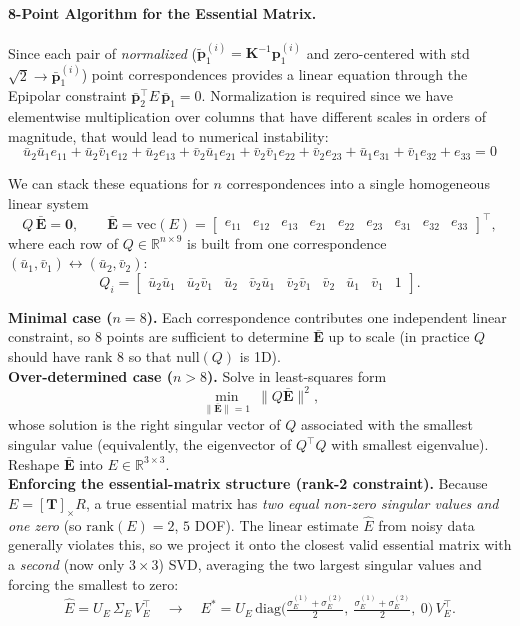 \documentclass{article}
\begin{document}
\paragraph{8-Point Algorithm for the Essential Matrix.} Since each pair of \textit{normalized} ($\mathbf{\tilde{p}}_1^{(i)}=\mathbf{K}^{-1}\mathbf{p}_1^{(i)}$ and zero-centered with std $\sqrt{2} \rightarrow  \mathbf{\bar{p}}_1^{(i)}$) point correspondences provides a linear equation through the Epipolar constraint $\bar{\mathbf p}_2^\top E\,\bar{\mathbf p}_1 = 0$. Normalization is required since we have elementwise multiplication over columns that have different scales in orders of magnitude, that would lead to numerical instability:
$$
\bar{u}_2 \bar{u}_1 e_{11}+\bar{u}_2 \bar{v}_1 e_{12}+\bar{u}_2 e_{13}+\bar{v}_2 \bar{u}_1 e_{21}+\bar{v}_2 \bar{v}_1 e_{22}+\bar{v}_2 e_{23}+\bar{u}_1 e_{31}+\bar{v}_1 e_{32}+e_{33}=0
$$

We can stack these equations for $n$ correspondences into a single homogeneous linear system
\[
Q\,\bar{\mathbf E} = \mathbf 0,
\qquad
\bar{\mathbf E}=\mathrm{vec}(E)=
\begin{bmatrix}
e_{11}&e_{12}&e_{13}&e_{21}&e_{22}&e_{23}&e_{31}&e_{32}&e_{33}
\end{bmatrix}^{\!\top},
\]
where each row of $Q\in\mathbb{R}^{n\times 9}$ is built from one correspondence
$(\bar u_1,\bar v_1)\leftrightarrow(\bar u_2,\bar v_2)$:
\[
Q_i=
\begin{bmatrix}
\bar u_2\bar u_1 & \bar u_2\bar v_1 & \bar u_2 &
\bar v_2\bar u_1 & \bar v_2\bar v_1 & \bar v_2 &
\bar u_1 & \bar v_1 & 1
\end{bmatrix}.
\]

\textbf{Minimal case ($n=8$).}
Each correspondence contributes one independent linear constraint, so $8$ points are sufficient to determine
$\bar{\mathbf E}$ up to scale (in practice $Q$ should have rank $8$ so that $\mathrm{null}(Q)$ is 1D).\\

\textbf{Over-determined case ($n>8$).}
Solve in least-squares form
\[
\min_{\|\bar{\mathbf E}\|=1}\ \|Q\bar{\mathbf E}\|^2,
\]
whose solution is the right singular vector of $Q$ associated with the smallest singular value
(equivalently, the eigenvector of $Q^\top Q$ with smallest eigenvalue). Reshape $\bar{\mathbf E}$ into
$E\in\mathbb{R}^{3\times 3}$.\\

\textbf{Enforcing the essential-matrix structure (rank-2 constraint).}
Because $E=[\mathbf T]_\times R$, a true essential matrix has \emph{two equal non-zero singular values and one zero} (so $\mathrm{rank}(E)=2$, $5$ DOF). The linear estimate $\hat E$ from noisy data generally violates this, so we project it onto the closest valid essential matrix with a \textit{second} (now only $3\times3$) SVD, averaging the two largest singular values and forcing the smallest to zero:
\[
\hat E = U_E\,\Sigma_E\,V_E^\top
\quad\longrightarrow\quad
E^\ast = U_E\,
\mathrm{diag}\!\Big(\tfrac{\sigma_E^{(1)}+\sigma_E^{(2)}}{2},\ \tfrac{\sigma_E^{(1)}+\sigma_E^{(2)}}{2},\ 0\Big)\,
V_E^\top .
\]
\end{document}
